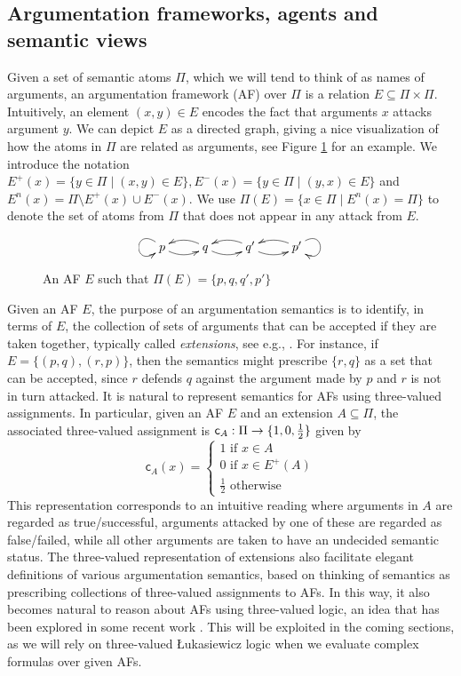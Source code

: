 \documentclass[greybox]{svmult}
\newcommand{\outa}[2]{#1^+(#2)}
\newcommand{\ina}[2]{#1^-(#2)}
\newcommand{\neu}[2]{#1^n(#2)}
\newcommand{\clab}{\mathsf c}
\begin{document}
\subsection{Argumentation frameworks, agents and semantic views}\label{subsec:arg}

Given a set of semantic atoms $\Pi$, which we will tend to think of as names of arguments, an argumentation framework (AF) over $\Pi$ is a relation $E \subseteq \Pi \times \Pi$. Intuitively, an element $(x,y) \in E$ encodes the fact that arguments $x$ attacks argument $y$. We can depict $E$ as a directed graph, giving a nice visualization of how the atoms in $\Pi$ are related as arguments, see Figure \ref{fig:1} for an example. 
We introduce the notation $\outa E x = \{y \in \Pi \mid (x,y) \in E\}, \ina E x = \{y \in \Pi \mid (y,x) \in E\}$ and $\neu E x = \Pi \setminus \outa E x \cup \ina E x$. We use $\Pi(E) = \{x \in \Pi \mid \neu E x = \Pi\}$ to denote the set of atoms from $\Pi$ that does not appear in any attack from $E$.

\begin{figure}
$$
\xymatrix{p \ar@(lu,ld) \ar@/_/[r] & q \ar@/_/[l] \ar@/_/[r] & q' \ar@/_/[l] \ar@/_/[r] & p' \ar@(ru,rd) \ar@/_/[l] }
$$
\caption{An AF $E$ such that $\Pi(E) = \{p,q,q',p'\}$}
\label{fig:1}
\end{figure}

Given an AF $E$, the purpose of an argumentation semantics is to identify, in terms of $E$, the 
collection of sets of arguments that can be accepted if they are taken together, typically called \emph{extensions}, see e.g., \cite{wu}. For instance, if $E = \{(p,q),(r,p)\}$, then the semantics might prescribe $\{r,q\}$ as a set that can be accepted, since $r$ defends $q$ against the argument made by $p$ and $r$ is not in turn attacked. It is natural to represent semantics for AFs using three-valued assignments. In particular, given an AF $E$ and an extension $A \subseteq \Pi$, the associated three-valued assignment is $\clab_A:\Pi \to \three$ given by
$$
\clab_A(x) = \begin{cases} 1 \text{ if } x \in A \\ 0 \text{ if } x \in \outa E A \\ \frac{1}{2} \text{ otherwise } \end{cases}
$$
This representation corresponds to an intuitive reading where arguments in $A$ are regarded as true/successful, arguments attacked by one of these are regarded as false/failed, while all other arguments are taken to have an undecided semantic status. The three-valued representation of extensions also facilitate elegant definitions of various argumentation semantics, based on thinking of semantics as prescribing collections of three-valued assignments to AFs. In this way, it also becomes natural to reason about AFs using three-valued logic, an idea that has been explored in some recent work \cite{dyrkolbotn,arieli,dyrkolbotn1}. This will be exploited in the coming sections, as we will rely on three-valued {\L}ukasiewicz logic when we evaluate complex formulas over given AFs.
\end{document}
